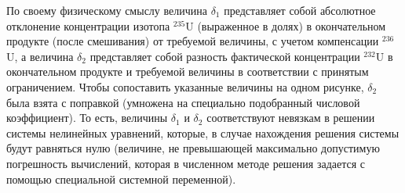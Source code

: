 По своему физическому смыслу величина $\delta_1$ представляет собой абсолютное отклонение концентрации изотопа $^{235}$U (выраженное в долях) в окончательном продукте (после смешивания) от требуемой величины, с учетом компенсации $^{236}$U, а величина $\delta_2$ представляет собой разность фактической концентрации $^{232}$U в окончательном продукте и требуемой величины в соответствии с принятым ограничением. Чтобы сопоставить указанные величины на одном рисунке, $\delta_2$ была взята с поправкой (умножена на специально подобранный числовой коэффициент). То есть, величины $\delta_1$ и $\delta_2$ соответствуют невязкам в решении системы нелинейных уравнений, которые, в случае нахождения решения системы будут равняться нулю (величине, не превышающей максимально допустимую погрешность вычислений, которая в численном методе решения задается с помощью специальной системной переменной).

